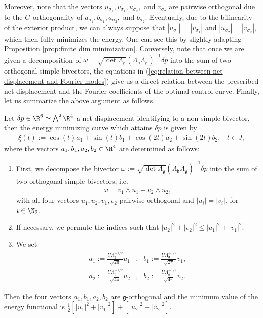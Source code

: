 Moreover, note that the vectors $u_{\sigma_1}, v_{\sigma_1}, u_{\sigma_2},$ and $v_{\sigma_2}$ are pairwise orthogonal due to the $G$-orthogonality of $a_{\sigma_1}, b_{\sigma_1}, a_{\sigma_2},$ and $b_{\sigma_2}$. Eventually, due to the bilinearity of the exterior product, we can always suppose that $|u_{\sigma_1}| = |v_{\sigma_1}|$ and $|u_{\sigma_2}| = |v_{\sigma_2}|$, which then fully minimizes the energy. One can see this by slightly adapting Proposition \ref{prop:finite dim minimization}. Conversely, note that once we are given a decomposition of $\omega  = 	\sqrt{\det \Lambda_{\mathfrak{g}}}(\Lambda_{\mathfrak{h}} \Lambda_{\mathfrak{g}})^{-1} \delta p$ into the sum of two orthogonal simple bivectors, the equations in (\ref{eq:relation between net displacement and Fourier modes}) give us a direct relation between the prescribed net displacement and the Fourier coefficients of the optimal control curve. Finally, let us summarize the above argument as follows.

\begin{theorem}
\label{thm:optimal_control_curves_general_case}
Let $\delta p \in \R^6 \simeq \bigwedge^2 \R^4$ a net displacement identifying to a non-simple bivector, then the energy minimizing curve which attains $\delta p$ is given by
\begin{eqnarray}
\xi(t) := \cos(t) a_1 + \sin(t) b_1 + \cos(2t) a_2 + \sin(2t) b_2,& t \in J,
\end{eqnarray}
where the vectors $a_1, b_1,a_2, b_2 \in \R^4$ are determined as follows:
\begin{enumerate}
\item First, we decompose the bivector $\omega := \sqrt{\det \Lambda_{\mathfrak{g}}}(\Lambda_{\mathfrak{h}} \tilde{\Lambda}_{\mathfrak{g}})^{-1} \delta p$ into the sum of two orthogonal simple bivectors, i.e.
\begin{align}
	\omega = v_1 \wedge u_1 + v_2 \wedge u_2,
\end{align}
with  all four vectors $u_1, u_2, v_1, v_2$ pairwise orthogonal and  $|u_i| = |v_i|$, for $i \in \N_2$.

\item If necessary, we permute the indices such that $|u_2|^2 + |v_2|^2 \leq |u_1|^2 + |v_1|^2$.

\item We set
	\begin{align}
		a_1 := \frac{U \Lambda_{\mathfrak{g}}^{-1/2}}{\sqrt{2 \pi}} u_1 &, & b_1 := \frac{U \Lambda_{\mathfrak{g}}^{-1/2}}{\sqrt{2 \pi}}v_1,\\
	a_2 := \frac{U \Lambda_{\mathfrak{g}}^{-1/2}}{\sqrt{4 \pi}} u_2& , & b_2 := \frac{U \Lambda_{\mathfrak{g}}^{-1/2}}{\sqrt{4 \pi}} v_2.	
	\end{align}
\end{enumerate}
Then the four vectors $a_1, b_1, a_2, b_2$ are $\mathfrak{g}$-orthogonal and the minimum value of the energy functional is $\frac{1}{2} [|u_1|^2 + |v_1|^2] +  [|u_2|^2 + |v_2|^2]$.
\end{theorem}

